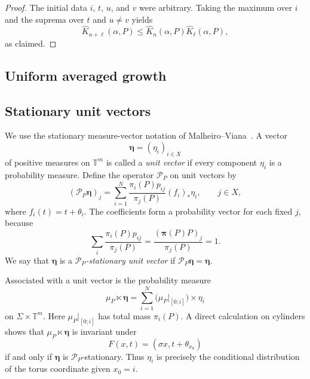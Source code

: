 \documentclass[11pt,a4paper]{amsart}
\newcommand{\T}{\mathbb T}
\begin{document}
\begin{proof}
The initial data \(i\), \(t\), \(u\), and \(v\) were arbitrary.
Taking the maximum over \(i\) and the suprema over \(t\) and
\(u\neq v\) yields
\[
 \widehat K_{n+\ell}(\alpha,P)
 \leq
 \widehat K_n(\alpha,P)
 \widehat K_\ell(\alpha,P),
\]
as claimed.
%
\end{proof}

\subsection{Uniform averaged growth}

\subsection{Stationary unit vectors}

We use the stationary measure-vector notation of
Malheiro--Viana~\cite[Section~3]{MV}.  A vector
\[
 \boldsymbol\eta=(\eta_i)_{i\in X}
\]
of positive measures on \(\T^m\) is called a \emph{unit vector} if
every component \(\eta_i\) is a probability measure.  Define the
operator \(\mathcal P_P\) on unit vectors by
\begin{equation}\label{eq:measure-vector-operator}
 (\mathcal P_P\boldsymbol\eta)_j
 =
 \sum_{i=1}^N
 \frac{\pi_i(P)p_{ij}}{\pi_j(P)}
 (f_i)_*\eta_i,
 \qquad j\in X,
\end{equation}
where \(f_i(t)=t+\theta_i\).  The coefficients form a probability
vector for each fixed \(j\), because
\[
 \sum_i\frac{\pi_i(P)p_{ij}}{\pi_j(P)}
 =
 \frac{(\boldsymbol\pi(P)P)_j}{\pi_j(P)}=1.
\]
We say that \(\boldsymbol\eta\) is a
\emph{\(\mathcal P_P\)-stationary unit vector} if
\(\mathcal P_P\boldsymbol\eta=\boldsymbol\eta\).

Associated with a unit vector is the probability measure
\begin{equation}\label{eq:skew-product-measure-vector}
 \mu_P\ltimes\boldsymbol\eta
 =
 \sum_{i=1}^N
 \bigl(\mu_P|_{[0;i]}\bigr)\times\eta_i
\end{equation}
on \(\Sigma\times\T^m\).  Here
\(\mu_P|_{[0;i]}\) has total mass \(\pi_i(P)\).  A direct calculation
on cylinders shows that
\(\mu_P\ltimes\boldsymbol\eta\) is invariant under
\[
 F(x,t)=(\sigma x,t+\theta_{x_0})
\]
if and only if \(\boldsymbol\eta\) is
\(\mathcal P_P\)-stationary.  Thus \(\eta_i\) is precisely the
conditional distribution of the torus coordinate given \(x_0=i\).
\end{document}
